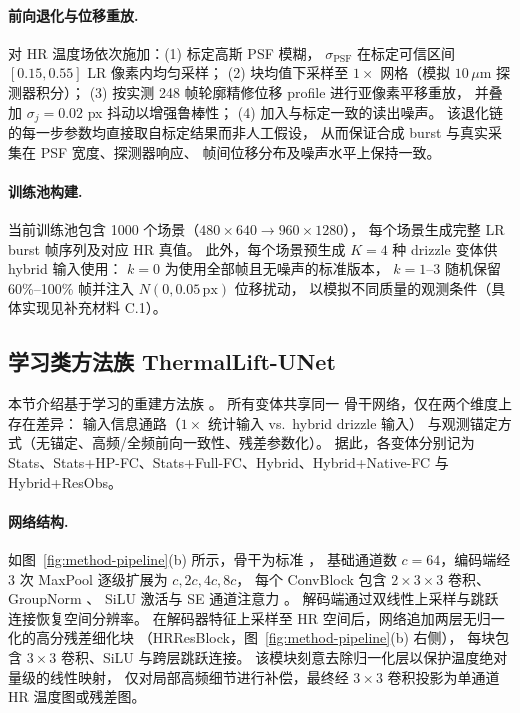 \paragraph{前向退化与位移重放.}
对 HR 温度场依次施加：(1) 标定高斯 PSF 模糊，
\(\sigma_{\mathrm{PSF}}\) 在标定可信区间 \([0.15, 0.55]\) LR 像素内均匀采样；
(2) 块均值下采样至 \(1\times\) 网格（模拟 \(10\,\mu\mathrm{m}\) 探测器积分）；
(3) 按实测 248 帧轮廓精修位移 profile 进行亚像素平移重放，
并叠加 \(\sigma_j = 0.02\) px 抖动以增强鲁棒性；
(4) 加入与标定一致的读出噪声。
该退化链的每一步参数均直接取自标定结果而非人工假设，
从而保证合成 burst 与真实采集在 PSF 宽度、探测器响应、
帧间位移分布及噪声水平上保持一致。

\paragraph{训练池构建.}
当前训练池包含 1000 个场景（\(480\times640 \to 960\times1280\)），
每个场景生成完整 LR burst 帧序列及对应 HR 真值。
此外，每个场景预生成 \(K=4\) 种 drizzle 变体供 hybrid 输入使用：
\(k\!=\!0\) 为使用全部帧且无噪声的标准版本，
\(k\!=\!1\text{--}3\) 随机保留 60\%--100\% 帧并注入
\(N(0, 0.05\,\text{px})\) 位移扰动，
以模拟不同质量的观测条件（具体实现见补充材料 C.1）。

\subsection{学习类方法族 ThermalLift-UNet}
\label{sec:learning-family}

本节介绍基于学习的重建方法族 。
所有变体共享同一  骨干网络，仅在两个维度上存在差异：
输入信息通路（\(1\times\) 统计输入 vs.\ hybrid drizzle 输入）
与观测锚定方式（无锚定、高频/全频前向一致性、残差参数化）。
据此，各变体分别记为
Stats、Stats+HP-FC、Stats+Full-FC、Hybrid、Hybrid+Native-FC 与 Hybrid+ResObs。

\paragraph{网络结构.}
如图~\ref{fig:method-pipeline}(b) 所示，骨干为标准  \cite{ronneberger2015unet}，
基础通道数 \(c=64\)，编码端经 3 次 MaxPool 逐级扩展为 \(c, 2c, 4c, 8c\)，
每个 ConvBlock 包含 \(2\times 3\!\times\!3\) 卷积、GroupNorm \cite{wu2018group}、
SiLU 激活与 SE 通道注意力 \cite{hu2018squeeze}。
解码端通过双线性上采样与跳跃连接恢复空间分辨率。
在解码器特征上采样至 HR 空间后，网络追加两层无归一化的高分残差细化块
（HRResBlock，图~\ref{fig:method-pipeline}(b) 右侧），
每块包含 \(3\!\times\!3\) 卷积、SiLU 与跨层跳跃连接。
该模块刻意去除归一化层以保护温度绝对量级的线性映射，
仅对局部高频细节进行补偿，最终经 \(3\!\times\!3\) 卷积投影为单通道 HR 温度图或残差图。

